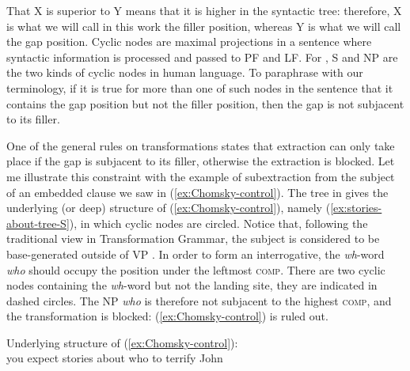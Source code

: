 That X is superior to Y means that it is higher in the syntactic tree: therefore, X is what we will call in this work the filler position, whereas Y is what we will call the gap position. Cyclic nodes are maximal projections in a sentence where syntactic information is processed and passed to PF and LF. For \citet{Chomsky.1973}, S and NP are the two kinds of cyclic nodes in human language. To paraphrase \citeauthor{Chomsky.1973} with our terminology, if it is true for more than one of such nodes in the sentence that it contains the gap position but not the filler position, then the gap is not subjacent to its filler. 

One of the general rules on transformations states that extraction can only take place if the gap is subjacent to its filler, otherwise the extraction is blocked.
Let me illustrate this constraint with the example of subextraction from the subject of an embedded clause we saw in (\ref{ex:Chomsky-control}). The tree in  gives the underlying (or deep) structure of (\ref{ex:Chomsky-control}), namely (\ref{ex:stories-about-tree-S}), in which cyclic nodes are circled. Notice that, following the traditional view in Transformation Grammar, the subject is considered to be base-generated outside of VP \citep{Chomsky.1965}. In order to form an interrogative, the \emph{wh}-word \emph{who} should occupy the position under the leftmost \textsc{comp}. There are two cyclic nodes containing the \emph{wh}-word but not the landing site, they are indicated in dashed circles. The NP \emph{who} is therefore not subjacent to the highest \textsc{comp}, and the transformation is blocked: (\ref{ex:Chomsky-control}) is ruled out.

\ea Underlying structure of (\ref{ex:Chomsky-control}):\\
you expect stories about who to terrify John
\label{ex:stories-about-tree-S}
\z 


